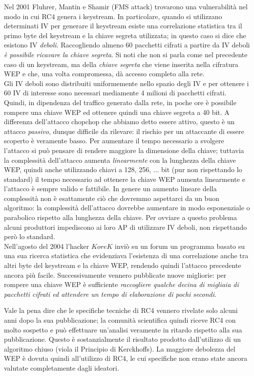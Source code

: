 Nel 2001 Fluhrer, Mantin e Shamir (FMS attack) trovarono una vulnerabilità nel modo in cui RC4 genera i keystream. In particolare, quando si utilizzano determinati IV per generare il keystream esiste una correlazione statistica tra il primo byte del keystream e la chiave segreta utilizzata; in questo caso si dice che esistono IV \textit{deboli}. Raccogliendo almeno 60 pacchetti cifrati a partire da IV deboli \textit{è possibile ricavare la chiave segreta}. Si noti che non si parla come nel precedente caso di un keystream, ma della \textit{chiave segreta} che viene inserita nella cifratura WEP e che, una volta compromessa, dà accesso completo alla rete.\\
Gli IV deboli sono distribuiti uniformemente nello spazio degli IV e per ottenere i 60 IV di interesse sono necessari mediamente 4 milioni di pacchetti cifrati. Quindi, in dipendenza del traffico generato dalla rete, in poche ore è possibile rompere una chiave WEP ed ottenere quindi una chiave segreta a 40 bit. A differenza dell'attacco chopchop che abbiamo detto essere attivo, questo è un attacco \textit{passivo}, dunque difficile da rilevare: il rischio per un attaccante di essere scoperto è veramente basso. Per aumentare il tempo necessario a svolgere l'attacco si può pensare di rendere maggiore la dimensione della chiave; tuttavia la complessità dell'attacco aumenta \textit{linearmente} con la lunghezza della chiave WEP, quindi anche utilizzando chiavi a 128, 256, $\dots$ bit (pur non rispettando lo standard) il tempo necessario ad ottenere la chiave WEP aumenta linearmente e l'attacco è sempre valido e fattibile. In genere un aumento lineare della complessità non è esattamente ciò che dovremmo aspettarci da un buon algoritmo: la complessità dell'attacco dovrebbe aumentare in modo esponenziale o parabolico rispetto alla lunghezza della chiave. Per ovviare a questo problema alcuni produttori impediscono ai loro AP di utilizzare IV deboli, non rispettando però lo standard.\\
Nell'agosto del 2004 l'hacker $KoreK$ inviò su un forum un programma basato su una sua ricerca statistica che evidenziava l'esistenza di una correlazione anche tra altri byte del keystream e la chiave WEP, rendendo quindi l'attacco precedente ancora più facile. Successivamente vennero pubblicate nuove migliorie: per rompere una chiave WEP è sufficiente \textit{raccogliere qualche decina di migliaia di pacchetti cifrati ed attendere un tempo di elaborazione di pochi secondi}.

Vale la pena dire che le specifiche tecniche di RC4 vennero rivelate solo alcuni anni dopo la sua pubblicazione; la comunità scientifica quindi riceve RC4 con molto sospetto e può effettuare un'analisi veramente in ritardo rispetto alla sua pubblicazione. Questo è sostanzialmente il risultato prodotto dall'utilizzo di un algoritmo chiuso (viola il Principio di Kerckhoffs). La maggiore debolezza del WEP è dovuta quindi all'utilizzo di RC4, le cui specifiche non erano state ancora valutate completamente dagli ideatori.\\

